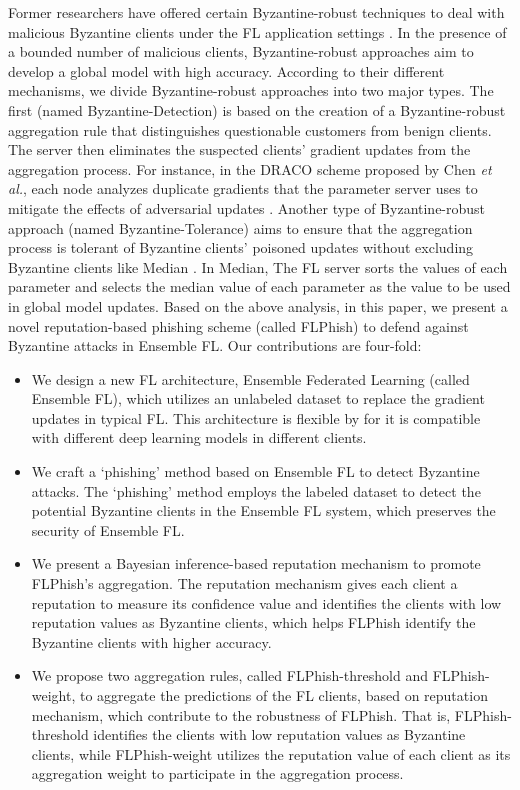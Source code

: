 \documentclass[journal]{IEEEtran}
\begin{document}
\par Former researchers have offered certain Byzantine-robust techniques to deal with malicious Byzantine clients under the FL application settings \cite{ref_12_defense,ref_13_defense,ref_15_defense,ref_16_defense,ref_17_defense,ref_28_defense,ref_29_defense,ref_30_defense,ref_31_defense,ref_32_defense}. In the presence of a bounded number of malicious clients, Byzantine-robust approaches aim to develop a global model with high accuracy. According to their different mechanisms, we divide Byzantine-robust approaches into two major types. The first (named Byzantine-Detection) is based on the creation of a Byzantine-robust aggregation rule that distinguishes questionable customers from benign clients. The server then eliminates the suspected clients' gradient updates from the aggregation process. For instance, in the DRACO scheme proposed by Chen \textit{et al.}, each node analyzes duplicate gradients that the parameter server uses to mitigate the effects of adversarial updates \cite{ref_13_defense}. Another type of Byzantine-robust approach (named Byzantine-Tolerance) aims to ensure that the aggregation process is tolerant of Byzantine clients' poisoned updates without excluding Byzantine clients like Median \cite{ref_16_defense}. In Median, The FL server sorts the values of each parameter and selects the median value of each parameter as the value to be used in global model updates. Based on the above analysis, in this paper, we present a novel reputation-based phishing scheme (called FLPhish) to defend against Byzantine attacks in Ensemble FL. Our contributions are four-fold:
\begin{itemize}
  \item We design a new FL architecture, Ensemble Federated Learning (called Ensemble FL), which utilizes an unlabeled dataset to replace the gradient updates in typical FL. This architecture is flexible by for it is compatible with different deep learning models in different clients.
  \item We craft a `phishing' method based on Ensemble FL to detect Byzantine attacks. The `phishing' method employs the labeled dataset to detect the potential Byzantine clients in the Ensemble FL system, which preserves the security of Ensemble FL.
  \item We present a Bayesian inference-based reputation mechanism to promote FLPhish's aggregation. The reputation mechanism gives each client a reputation to measure its confidence value and identifies the clients with low reputation values as Byzantine clients, which helps FLPhish identify the Byzantine clients with higher accuracy.
  \item We propose two aggregation rules, called FLPhish-threshold and FLPhish-weight, to aggregate the predictions of the FL clients, based on reputation mechanism, which contribute to the robustness of FLPhish. That is, FLPhish-threshold identifies the clients with low reputation values as Byzantine clients, while FLPhish-weight utilizes the reputation value of each client as its aggregation weight to participate in the aggregation process.
\end{itemize}
\end{document}
